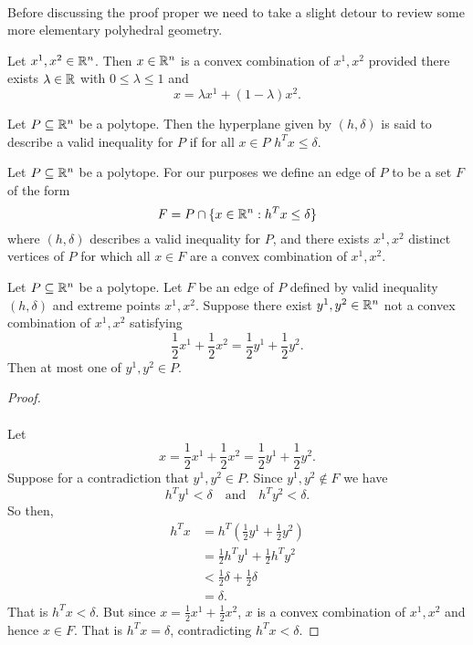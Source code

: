 \paragraph{}
Before discussing the proof proper we need to take a slight detour to review some more elementary polyhedral geometry.
\begin{definition}
Let $x^1, x^2 \in \mathbb{R}^n$. Then $x \in \mathbb{R}^n$ is a convex combination of $x^1, x^2$ provided there exists $\lambda \in \mathbb{R}$ with $0 \leq \lambda \leq 1$ and $$x = \lambda x^1 + (1-\lambda)x^2.$$
\end{definition}
\begin{definition}
Let $P\subseteq \mathbb{R}^n$ be a polytope. Then the hyperplane given by $(h,\delta)$ is said to describe a valid inequality for $P$ if for all $x \in P$ $h^Tx \leq \delta$.
\end{definition}
\begin{definition}
Let $P \subseteq \mathbb{R}^n$ be a polytope. For our purposes we define an edge of $P$ to be a set $F$ of the form $$F = P \cap \{x \in \mathbb{R}^n: h^Tx \leq \delta \}$$ where $(h,\delta)$ describes a valid inequality for $P$, and there exists $x^1, x^2$ distinct vertices of $P$ for which all $x \in F$ are a convex combination of $x^1, x^2$.
\end{definition}
\begin{lemma}\label{lemma:edge-midpoint}
Let $P \subseteq \mathbb{R}^n$ be a polytope. Let $F$ be an edge of $P$ defined by valid inequality $(h,\delta)$ and extreme points $x^1, x^2$. Suppose there exist $y^1, y^2 \in \mathbb{R}^n$ not a convex combination of $x^1, x^2$ satisfying
$$\frac{1}{2}x^1 + \frac{1}{2} x^2 = \frac{1}{2} y^1 + \frac{1}{2}y^2.$$
Then at most one of $y^1, y^2 \in P$.
\end{lemma}
\begin{proof}
\paragraph{}
Let $$x = \frac{1}{2}x^1 + \frac{1}{2} x^2 = \frac{1}{2} y^1 + \frac{1}{2}y^2.$$ Suppose for a contradiction that $y^1,y^2 \in P$. Since $y^1, y^2 \not\in F$ we have
$$h^Ty^1 < \delta \quad\text{and}\quad h^Ty^2 < \delta. $$
So then,
\begin{align*}
h^Tx &= h^T(\frac{1}{2}y^1 + \frac{1}{2}y^2) \\
&= \frac{1}{2}h^Ty^1 + \frac{1}{2}h^Ty^2 \\
&< \frac{1}{2}\delta + \frac{1}{2}\delta \\
&= \delta.
\end{align*}
That is $h^T x < \delta$. But since $x = \frac{1}{2} x^1 + \frac{1}{2}x^2$, $x$ is a convex combination of $x^1, x^2$ and hence $x \in F$. That is $h^T x = \delta$, contradicting $h^T x < \delta$.
\end{proof}
